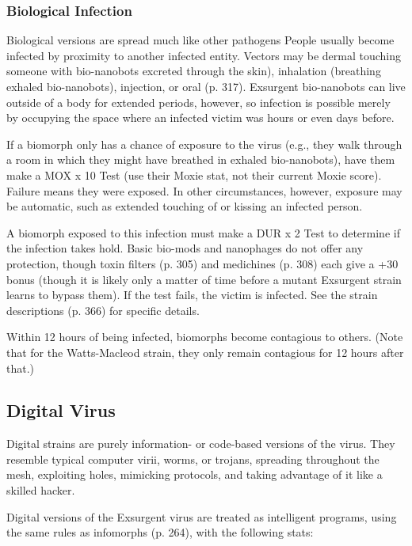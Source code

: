 \subsubsection{Biological Infection}

Biological versions are spread much like other pathogens
People usually become infected by proximity to
another infected entity. Vectors may be dermal touching
someone with bio-nanobots excreted through the
skin), inhalation (breathing exhaled bio-nanobots), 
injection, or oral (p. 317). Exsurgent bio-nanobots can 
live outside of a body for extended periods, however, 
so infection is possible merely by occupying the space 
where an infected victim was hours or even days before.

If a biomorph only has a chance of exposure to the 
virus (e.g., they walk through a room in which they 
might have breathed in exhaled bio-nanobots), have 
them make a MOX x 10 Test (use their Moxie stat, 
not their current Moxie score). Failure means they 
were exposed. In other circumstances, however, exposure
may be automatic, such as extended touching of
or kissing an infected person. 

A biomorph exposed to this infection must make 
a DUR x 2 Test to determine if the infection takes 
hold. Basic bio-mods and nanophages do not offer 
any protection, though toxin filters (p. 305) and 
medichines (p. 308) each give a +30 bonus (though it 
is likely only a matter of time before a mutant Exsurgent
strain learns to bypass them). If the test fails, the
victim is infected. See the strain descriptions (p. 366) 
for specific details.

Within 12 hours of being infected, biomorphs 
become contagious to others. (Note that for the 
Watts-Macleod strain, they only remain contagious 
for 12 hours after that.)

\subsection{Digital Virus}

Digital strains are purely information- or code-based 
versions of the virus. They resemble typical computer 
virii, worms, or trojans, spreading throughout the 
mesh, exploiting holes, mimicking protocols, and 
taking advantage of it like a skilled hacker.

Digital versions of the Exsurgent virus are treated 
as intelligent programs, using the same rules as infomorphs
(p. 264), with the following stats:

